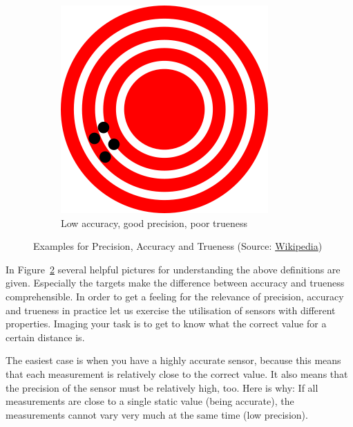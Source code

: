 \begin{figure}[htbp]
\begin{subfigure}[b]{0.2\textwidth}
 \includegraphics[width=\textwidth]{img/High_precision_Low_accuracy.png}
 \caption{Low accuracy, good precision, poor trueness}
 \label{sfig:high_precision}
 \end{subfigure}
 \caption{Examples for Precision, Accuracy and Trueness (Source: \href{https://en.wikipedia.org/wiki/Accuracy_and_precision}{Wikipedia})}
 \label{fig:prec_accur_truen}
\end{figure}

In Figure~\ref{fig:prec_accur_truen} several helpful pictures for understanding the above definitions are given. Especially the targets make the difference between accuracy and trueness comprehensible. In order to get a feeling for the relevance of precision, accuracy and trueness in practice let us exercise the utilisation of sensors with different properties. Imaging your task is to get to know what the correct value for a certain distance is.

The easiest case is when you have a highly accurate sensor, because this means that each measurement is relatively close to the correct value. It also means that the precision of the sensor must be relatively high, too. Here is why: If all measurements are close to a single static value (being accurate), the measurements cannot vary very much at the same time (low precision).


